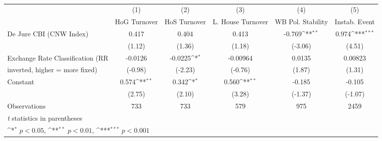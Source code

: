 \begin{table}[htbp]\centering
\def\sym#1{\ifmmode^{#1}\else\(^{#1}\)\fi}
\caption{\label{lkmultIndFEDJ}}
\begin{tabular}{l*{5}{c}}
\toprule
                                        &\multicolumn{1}{c}{(1)}&\multicolumn{1}{c}{(2)}&\multicolumn{1}{c}{(3)}&\multicolumn{1}{c}{(4)}&\multicolumn{1}{c}{(5)}\\
                                        &\multicolumn{1}{c}{HoG Turnover}&\multicolumn{1}{c}{HoS Turnover}&\multicolumn{1}{c}{L. House Turnover}&\multicolumn{1}{c}{WB Pol. Stability}&\multicolumn{1}{c}{Instab. Event}\\
\midrule
De Jure CBI (CNW Index)                 &    0.417         &    0.404         &    0.413         &   -0.769\sym{**} &    0.974\sym{***}\\
                                        &   (1.12)         &   (1.36)         &   (1.18)         &  (-3.06)         &   (4.51)         \\
\addlinespace
Exchange Rate Classification (RR        &  -0.0126         &  -0.0225\sym{*}  & -0.00964         &   0.0135         &  0.00823         \\
inverted, higher = more fixed)          &  (-0.98)         &  (-2.23)         &  (-0.76)         &   (1.87)         &   (1.31)         \\
\addlinespace
Constant                                &    0.574\sym{**} &    0.342\sym{*}  &    0.560\sym{**} &   -0.185         &   -0.105         \\
                                        &   (2.75)         &   (2.10)         &   (3.28)         &  (-1.37)         &  (-1.07)         \\
\midrule
Observations                            &      733         &      733         &      579         &      975         &     2459         \\
\bottomrule
\multicolumn{6}{l}{\footnotesize \textit{t} statistics in parentheses}\\
\multicolumn{6}{l}{\footnotesize \sym{*} \(p<0.05\), \sym{**} \(p<0.01\), \sym{***} \(p<0.001\)}\\
\end{tabular}
\end{table}

